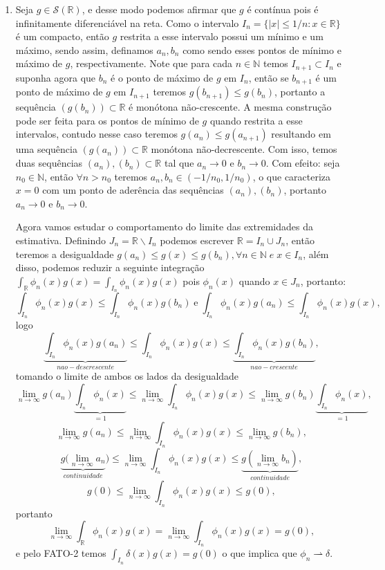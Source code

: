 \documentclass{article}
\begin{document}
\begin{enumerate}
\begin{enumerate}
					
				\item Seja $g \in \mathcal{S}(\mathbb{R})$, e desse modo 
				podemos afirmar que $g$ é contínua pois é infinitamente diferenciável na reta. Como o intervalo $I_{n} = \{|x| \leq 1/n: x \in \mathbb{R} \}$ é um compacto, então $g$ restrita a esse intervalo possui um mínimo e um máximo, sendo assim, definamos $a_{n}, b_{n}$ como sendo esses pontos de mínimo e máximo de $g$, respectivamente. Note que para cada $n \in \mathbb{N}$ temos $I_{n+1} \subset I_{n}$ e suponha agora que $b_{n}$ é o ponto de máximo de $g$ em $I_{n}$, então se $b_{n+1}$ é um ponto de máximo de $g$ em $I_{n+1}$ teremos $g(b_{n+1}) \leq g(b_{n})$, portanto a sequência $(g(b_{n})) \subset \mathbb{R}$ é monótona não-crescente. A mesma construção pode ser feita para os pontos de mínimo de $g$ quando restrita a esse intervalos, contudo nesse caso teremos $g(a_{n}) \leq g(a_{n+1})$ resultando em uma sequência $(g(a_{n})) \subset \mathbb{R}$ monótona não-decrescente. Com isso, temos duas sequências $(a_{n}), (b_{n}) \subset \mathbb{R}$ tal que $a_{n} \to 0$ e $b_{n} \to 0$. Com efeito: seja $n_{0} \in \mathbb{N}$, então $\forall n > n_0$ teremos $a_{n}, b_{n}  \in (-1/n_{0}, 1/n_{0})$, o que caracteriza $x=0$ com um ponto de aderência das sequências $(a_{n}), (b_{n})$, portanto $a_{n} \to 0$ e $b_{n} \to 0$.
				
				Agora vamos estudar o comportamento do limite das extremidades da estimativa. Definindo $J_{n} = \mathbb{R}\backslash I_{n}$ podemos escrever $\mathbb{R} = I_{n} \cup J_{n}$, então teremos a desigualdade $g(a_{n}) \leq g(x) \leq g(b_{n}), \forall n \in \mathbb{N} \; e \; x \in I_{n}$, além disso, podemos reduzir a seguinte integração $\int_{\mathbb{R}} \phi_{n}(x)g(x) = \int_{I_{n}} \phi_{n}(x)g(x)$ pois $\phi_{n}(x)$ quando $x \in J_{n}$, portanto:
				$$
				\int_{I_{n}} \phi_{n}(x) g(x) \leq \int_{I_{n}} \phi_{n}(x) g(b_{n}) \; \text{e} \;
				\int_{I_{n}} \phi_{n}(x) g(a_{n}) \leq \int_{I_{n}} \phi_{n}(x)g(x),
				$$
				logo
				$$
				\underbrace{ \int_{I_{n}} \phi_{n}(x) g(a_{n}) }_{nao-descrescente} 
				\leq \int_{I_{n}} \phi_{n}(x)g(x) \leq \underbrace{\int_{I_{n}} \phi_{n}(x) g(b_{n})}_{nao-crescente},
				$$
				tomando o limite de ambos os lados da desigualdade
				$$
				\lim_{n\to \infty} g(a_{n}) \underbrace{ \int_{I_{n}} \phi_{n}(x) }_{=1}\leq \lim_{n\to \infty} \int_{I_{n}}\phi_{n}(x)g(x) \leq  \lim_{n\to \infty}  g(b_{n}) \underbrace{ \int_{I_{n}} \phi_{n}(x) }_{=1},
				$$
				$$
				\lim_{n\to \infty} g(a_{n}) \leq \lim_{n\to \infty} \int_{I_{n}}\phi_{n}(x)g(x) \leq  \lim_{n\to \infty}  g(b_{n}) ,
				$$
				$$
				\underbrace{ g(\lim_{n\to \infty} a_{n}}_{continuidade}) \leq \lim_{n\to \infty} \int_{I_{n}}\phi_{n}(x)g(x) \leq \underbrace{ g(\lim_{n\to \infty} b_{n}) }_{continuidade} ,
				$$
				$$
				g(0) \leq \lim_{n\to \infty} \int_{I_{n}}\phi_{n}(x)g(x) \leq  g(0) ,
				$$
				portanto
				$$
				 \lim_{n\to \infty} \int_{\mathbb{R}} \phi_{n}(x)g(x) = \lim_{n\to \infty} \int_{I_{n}}\phi_{n}(x)g(x) = g(0),
				$$
				e pelo FATO-2 temos $\int_{I_{n}}\delta(x)g(x) = g(0)$ o que implica que $\phi_{n} \rightharpoonup \delta$.
				

\end{enumerate}
\end{enumerate}
\end{document}
